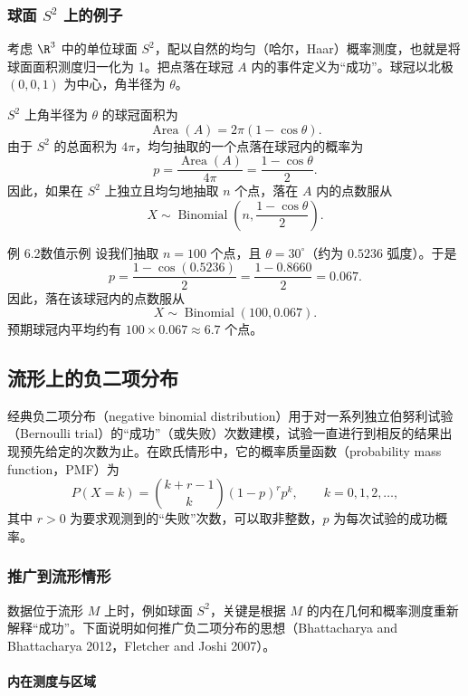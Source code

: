 \subsubsection{球面 \texorpdfstring{$S^2$}{S²} 上的例子}

考虑 $\R^3$ 中的单位球面 $S^2$，配以自然的均匀（哈尔，Haar）概率测度，也就是将球面面积测度归一化为 1。把点落在球冠 $A$ 内的事件定义为“成功”。球冠以北极 $(0,0,1)$ 为中心，角半径为 $\theta$。

$S^2$ 上角半径为 $\theta$ 的球冠面积为
\[
  \operatorname{Area}(A)=2\pi(1-\cos\theta).
\]
由于 $S^2$ 的总面积为 $4\pi$，均匀抽取的一个点落在球冠内的概率为
\[
  p=\frac{\operatorname{Area}(A)}{4\pi}=\frac{1-\cos\theta}{2}.
\]
因此，如果在 $S^2$ 上独立且均匀地抽取 $n$ 个点，落在 $A$ 内的点数服从
\[
  X\sim\operatorname{Binomial}\left(n,\frac{1-\cos\theta}{2}\right).
\]

\begin{statement}{例 6.2}{数值示例}
设我们抽取 $n=100$ 个点，且 $\theta=30^\circ$（约为 $0.5236$ 弧度）。于是
\[
  p=\frac{1-\cos(0.5236)}{2}=\frac{1-0.8660}{2}=0.067.
\]
因此，落在该球冠内的点数服从
\[
  X\sim\operatorname{Binomial}(100,0.067).
\]
预期球冠内平均约有 $100\times 0.067\approx 6.7$ 个点。
\end{statement}

\subsection{流形上的负二项分布}

经典负二项分布（negative binomial distribution）用于对一系列独立伯努利试验（Bernoulli trial）的“成功”（或失败）次数建模，试验一直进行到相反的结果出现预先给定的次数为止。在欧氏情形中，它的概率质量函数（probability mass function，PMF）为
\[
  P(X=k)=\binom{k+r-1}{k}(1-p)^r p^k,\qquad k=0,1,2,\ldots,
\]
其中 $r>0$ 为要求观测到的“失败”次数，可以取非整数，$p$ 为每次试验的成功概率。

\subsubsection{推广到流形情形}

数据位于流形 $M$ 上时，例如球面 $S^2$，关键是根据 $M$ 的内在几何和概率测度重新解释“成功”。下面说明如何推广负二项分布的思想（Bhattacharya and Bhattacharya 2012，Fletcher and Joshi 2007）。

\paragraph{内在测度与区域}

